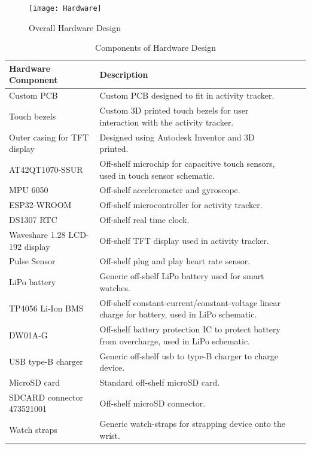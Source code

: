 \documentclass[12pt, titlepage]{article}
\begin{document}
\begin{figure}[H]
	\begin{center}
		 \texttt{[image: Hardware]}
		\caption{Overall Hardware Design}
		\label{Hardware} 
	\end{center}
\end{figure}

\begin{table}[H]
	\begin{tabularx}{1.05\textwidth} { 
		  | >{\centering\arraybackslash}X 
		  | >{\centering\arraybackslash}X 
		  | >{\centering\arraybackslash}X 
		  | >{\centering\arraybackslash}X | }
		 \hline
		 \textbf{Hardware Component} & \textbf{Description}\\
		 \hline
		Custom PCB & Custom PCB designed to fit in activity tracker.  \\
		\hline 
		Touch bezels & Custom 3D printed touch bezels for user interaction with the activity tracker.\\
		\hline
		Outer casing for TFT display & Designed using Autodesk Inventor and 3D printed. \\
		\hline 
		AT42QT1070-SSUR & Off-shelf microchip for capacitive touch sensors, used in touch sensor schematic.\\
		\hline
		 MPU 6050 & Off-shelf accelerometer and gyroscope.\\
		\hline
		 ESP32-WROOM  & Off-shelf microcontroller for activity tracker.\\
		 \hline
		   DS1307 RTC & Off-shelf real time clock. \\
		\hline
		Waveshare 1.28 LCD-192 display & Off-shelf TFT display used in activity tracker. \\
		\hline 
		Pulse Sensor & Off-shelf plug and play heart rate sensor.\\
		\hline 
		LiPo battery & Generic off-shelf LiPo battery used for smart watches.  \\
		\hline 
		TP4056 Li-Ion BMS & Off-shelf constant-current/constant-voltage linear charge for battery, used in LiPo schematic.\\
		\hline
		DW01A-G & Off-shelf battery protection IC  to protect battery from overcharge, used in LiPo schematic.\\
		\hline
		USB type-B charger & Generic off-shelf usb to type-B charger to charge device. \\
		\hline 
		MicroSD card & Standard off-shelf microSD card. \\
		\hline
		SDCARD connector 473521001& Off-shelf microSD connector. \\
		\hline 
		Watch straps & Generic watch-straps for strapping device onto the wrist. \\
		\hline 
	\end{tabularx}
\caption{\label{DesignHardware}Components of Hardware Design}  
\end{table}
\end{document}
